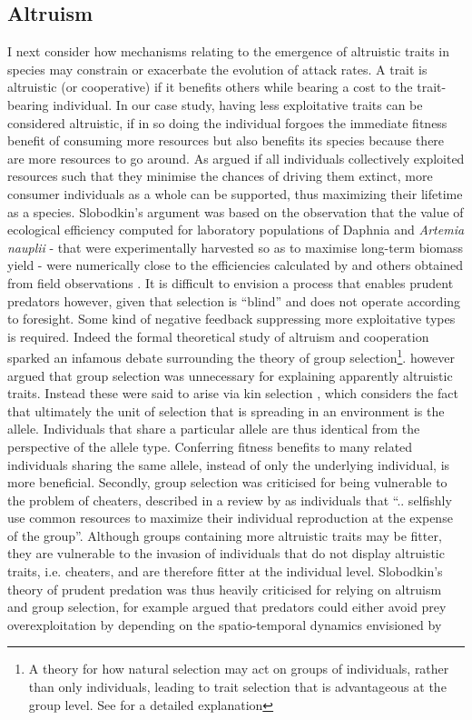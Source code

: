 \documentclass[a4paper]{report}
\begin{document}
\subsection{Altruism \label{sec:Altruism}} I next consider how mechanisms relating to the emergence of altruistic traits in species may constrain or exacerbate the evolution of attack rates. A trait is altruistic (or cooperative) if it benefits others while bearing a cost to the trait-bearing individual. In our case study, having less exploitative traits can be considered altruistic, if in so doing the individual forgoes the immediate fitness benefit of consuming more resources but also benefits its species because there are more resources to go around. As argued \citep{Slobodkin1968} if all individuals collectively exploited resources such that they minimise the chances of driving them extinct, more consumer individuals as a whole can be supported, thus maximizing their lifetime as a species. Slobodkin’s argument was based on the observation that the value of ecological efficiency computed for laboratory populations of Daphnia and \textit{Artemia nauplii} \citep{Slobodkin1964} - that were experimentally harvested so as to maximise long-term biomass yield - were numerically close to the efficiencies calculated by \citep{Lindeman1991} and others obtained from field observations \citep{Slobodkin1960}. It is difficult to envision a process that enables prudent predators however, given that selection is “blind” and does not operate according to foresight. Some kind of negative feedback suppressing more exploitative types is required. Indeed the formal theoretical study of altruism and cooperation sparked an infamous debate surrounding the theory of group selection\footnote{A theory for how natural selection may act on groups of individuals, rather than only individuals, leading to trait selection that is advantageous at the group level. See \citep{edwards1986} for a detailed explanation}. \citep{J.MaynardSmith1964} however argued that group selection was unnecessary for explaining apparently altruistic traits. Instead these were said to arise via kin selection \citep{Hamilton1964}, which considers the fact that ultimately the unit of selection that is spreading in an environment is the allele. Individuals that share a particular allele are thus identical from the perspective of the allele type. Conferring fitness benefits to many related individuals sharing the same allele, instead of only the underlying individual, is more beneficial. Secondly, group selection was criticised for being vulnerable to the problem of cheaters, described in a review by \citep{Maclean2006} as individuals that “.. selfishly use common resources to maximize their individual reproduction at the expense of the group”. Although groups containing more altruistic traits may be fitter, they are vulnerable to the invasion of individuals that do not display altruistic traits, i.e. cheaters, and are therefore fitter at the individual level. Slobodkin’s theory of prudent predation was thus heavily criticised for relying on altruism and group selection, \citep{Society2011} for example argued that predators could either avoid prey overexploitation by depending on the spatio-temporal dynamics envisioned by 
\end{document}
